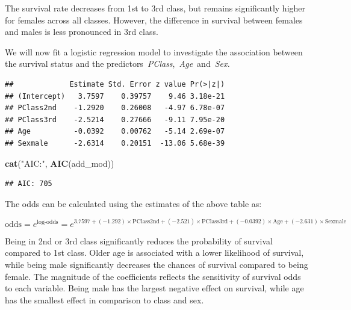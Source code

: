 \documentclass[
  11pt,
]{article}
\newenvironment{Shaded}{\begin{snugshade}}{\end{snugshade}}
\newcommand{\AttributeTok}[1]{\textcolor[rgb]{0.13,0.29,0.53}{#1}}
\newcommand{\FunctionTok}[1]{\textcolor[rgb]{0.13,0.29,0.53}{\textbf{#1}}}
\newcommand{\NormalTok}[1]{#1}
\newcommand{\OtherTok}[1]{\textcolor[rgb]{0.56,0.35,0.01}{#1}}
\newcommand{\SpecialCharTok}[1]{\textcolor[rgb]{0.81,0.36,0.00}{\textbf{#1}}}
\newcommand{\StringTok}[1]{\textcolor[rgb]{0.31,0.60,0.02}{#1}}
\begin{document}
The survival rate decreases from 1st to 3rd class, but remains
significantly higher for females across all classes. However, the
difference in survival between females and males is less pronounced in
3rd class.

We will now fit a logistic regression model to investigate the
association between the survival status and the
predictors~\emph{PClass},~\emph{Age}~and~\emph{Sex.}

\begin{Shaded}
\end{Shaded}

\begin{verbatim}
##             Estimate Std. Error z value Pr(>|z|)
## (Intercept)   3.7597    0.39757    9.46 3.18e-21
## PClass2nd    -1.2920    0.26008   -4.97 6.78e-07
## PClass3rd    -2.5214    0.27666   -9.11 7.95e-20
## Age          -0.0392    0.00762   -5.14 2.69e-07
## Sexmale      -2.6314    0.20151  -13.06 5.68e-39
\end{verbatim}

\begin{Shaded}
\begin{Highlighting}[]
\FunctionTok{cat}\NormalTok{(}\StringTok{"AIC:"}\NormalTok{, }\FunctionTok{AIC}\NormalTok{(add\_mod))}
\end{Highlighting}
\end{Shaded}

\begin{verbatim}
## AIC: 705
\end{verbatim}

The odds can be calculated using the estimates of the above table as:

\[
\text{odds} = e^{\text{log-odds}} = e^{3.7597 + (-1.292) \times \text{PClass2nd} + (-2.521) \times \text{PClass3rd} + (-0.0392) \times \text{Age} + (-2.631) \times \text{Sexmale}} 
\]

Being in 2nd or 3rd class significantly reduces the probability of
survival compared to 1st class. Older age is associated with a lower
likelihood of survival, while being male significantly decreases the
chances of survival compared to being female. The magnitude of the
coefficients reflects the sensitivity of survival odds to each variable.
Being male has the largest negative effect on survival, while age has
the smallest effect in comparison to class and sex.
\end{document}

